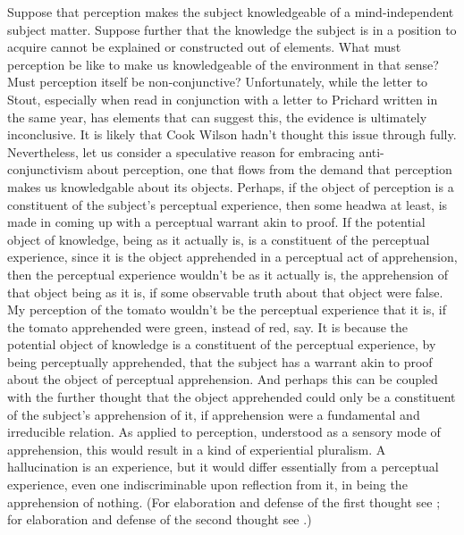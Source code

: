 \documentclass[12pt]{article}
\begin{document}
Suppose that perception makes the subject knowledgeable of a mind-independent subject matter. Suppose further that the knowledge the subject is in a position to acquire cannot be explained or constructed out of elements. What must perception be like to make us knowledgeable of the environment in that sense? Must perception itself be non-conjunctive? Unfortunately, while the letter to Stout, especially when read in conjunction with a letter to Prichard written in the same year, has elements that can suggest this, the evidence is ultimately inconclusive. It is likely that Cook Wilson hadn't thought this issue through fully. Nevertheless, let us consider a speculative reason for embracing anti-conjunctivism about perception, one that flows from the demand that perception makes us knowledgable about its objects. Perhaps, if the object of perception is a constituent of the subject's perceptual experience, then some headwa at least, is made in coming up with a perceptual warrant akin to proof. If the potential object of knowledge, being as it actually is, is a constituent of the perceptual experience, since it is the object apprehended in a perceptual act of apprehension, then the perceptual experience wouldn't be as it actually is, the apprehension of that object being as it is, if some observable truth about that object were false. My perception of the tomato wouldn't be the perceptual experience that it is, if the tomato apprehended were green, instead of red, say. It is because the potential object of knowledge is a constituent of the perceptual experience, by being perceptually apprehended, that the subject has a warrant akin to proof about the object of perceptual apprehension.  And perhaps this can be coupled with the further thought that the object apprehended could only be a constituent of the subject's apprehension of it, if apprehension were a fundamental and irreducible relation. As applied to perception, understood as a sensory mode of apprehension, this would result in a kind of experiential pluralism. A hallucination is an experience, but it would differ essentially from a perceptual experience, even one indiscriminable upon reflection from it, in being the apprehension of nothing. (For elaboration and defense of the first thought see \citealt{Kalderon:2011fk}; for elaboration and defense of the second thought see \citealt{Kalderon:2012fk}.)
\end{document}
